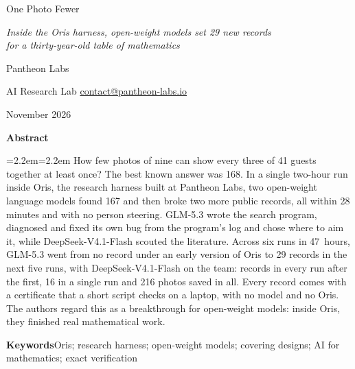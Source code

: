 \documentclass[11pt,letterpaper]{article}
\begin{document}
\thispagestyle{firstpage}

\begin{center}
\vspace*{2pt}
{\fontsize{23}{27}\selectfont One Photo Fewer\par}
\vspace{6pt}
{\large\itshape Inside the Oris harness, open-weight models set 29 new records\\[1pt] for a thirty-year-old table of mathematics\par}
\vspace{13pt}
{Pantheon Labs\par}
\vspace{1pt}
{\small AI Research Lab \textperiodcentered{} \href{mailto:contact@pantheon-labs.io}{contact@pantheon-labs.io}\par}
\vspace{5pt}
{\small November 2026\par}
\end{center}
\vspace{5pt}

\begin{center}\textbf{\small Abstract}\end{center}
\vspace{-5pt}
{\small\leftskip=2.2em\rightskip=2.2em\noindent
How few photos of nine can show every three of 41 guests together at least once? The best known answer was 168. In a single two-hour run inside Oris, the research harness built at Pantheon Labs, two open-weight language models found 167 and then broke two more public records, all within 28 minutes and with no person steering. GLM-5.3 wrote the search program, diagnosed and fixed its own bug from the program's log and chose where to aim it, while \mbox{DeepSeek-V4.1-Flash} scouted the literature. Across six runs in 47~hours, GLM-5.3 went from no record under an early version of Oris to 29 records in the next five runs, with \mbox{DeepSeek-V4.1-Flash} on the team: records in every run after the first, 16 in a single run and 216 photos saved in all. Every record comes with a certificate that a short script checks on a laptop, with no model and no Oris. The authors regard this as a breakthrough for open-weight models: inside Oris, they finished real mathematical work.\par}

\vspace{6pt}
{\small\noindent\textbf{Keywords}\enspace Oris; research harness; open-weight models; covering designs; AI for mathematics; exact verification\par}
\end{document}

